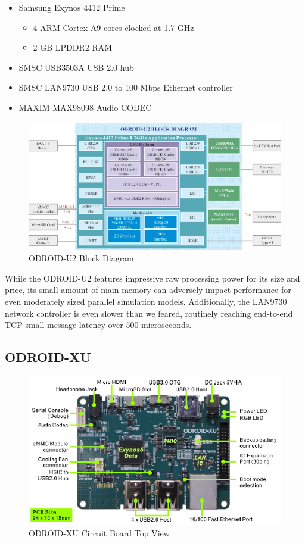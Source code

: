 \documentclass[11pt]{book}
\begin{document}
\begin{itemize}
\item Samsung Exynos 4412 Prime
  \begin{itemize}
  \item 4 ARM Cortex-A9 cores clocked at 1.7 GHz
  \item 2 GB LPDDR2 RAM
  \end{itemize}
\item SMSC USB3503A USB 2.0 hub
\item SMSC LAN9730 USB 2.0 to 100 Mbps Ethernet controller
\item MAXIM MAX98098 Audio CODEC
\end{itemize}

\begin{figure}[h]
\centering
\includegraphics[width=\textwidth]{odroid_u2_block_diagram}
\caption{ODROID-U2 Block Diagram \cite{odroid-u2-board-detail}}
\label{odroid-u2-block-diagram}
\end{figure}

While the ODROID-U2 features impressive raw processing power for its size and
price, its small amount of main memory can adversely impact performance for even
moderately sized parallel simulation models. Additionally, the LAN9730 network
controller is even slower than we feared, routinely reaching end-to-end TCP
small message latency over 500 microseconds.


\subsection{\textbf{ODROID-XU}}

\begin{figure}[h]
\includegraphics[width=\textwidth]{odroid_xu_top}
\caption{ODROID-XU Circuit Board Top View \cite{odroid-xu-board-detail}}
\label{odroid-xu-board}
\end{figure}
\end{document}

